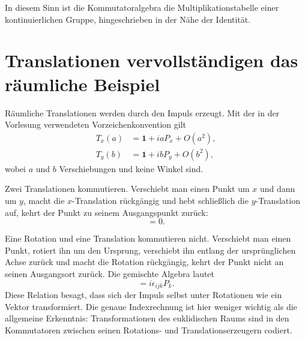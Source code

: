 In diesem Sinn ist die Kommutatoralgebra die Multiplikationstabelle einer kontinuierlichen Gruppe, hingeschrieben in der Nähe der Identität.

\section{Translationen vervollständigen das räumliche Beispiel}

Räumliche Translationen werden durch den Impuls erzeugt. Mit der in der Vorlesung verwendeten Vorzeichenkonvention gilt
\begin{equation}
\begin{aligned}
T_x(a)&=\mathbf 1+iaP_x+O(a^2),\\
T_y(b)&=\mathbf 1+ibP_y+O(b^2),
\end{aligned}
\end{equation}
wobei \(a\) und \(b\) Verschiebungen und keine Winkel sind.

Zwei Translationen kommutieren. Verschiebt man einen Punkt um \(x\) und dann um \(y\), macht die \(x\)-Translation rückgängig und hebt schließlich die \(y\)-Translation auf, kehrt der Punkt zu seinem Ausgangspunkt zurück:
\begin{equation}
[P_i,P_j]=0.
\end{equation}

\begin{classroomqa}
\end{classroomqa}

Eine Rotation und eine Translation kommutieren nicht. Verschiebt man einen Punkt, rotiert ihn um den Ursprung, verschiebt ihn entlang der ursprünglichen Achse zurück und macht die Rotation rückgängig, kehrt der Punkt nicht an seinen Ausgangsort zurück. Die gemischte Algebra lautet
\begin{equation}
[L_i,P_j]=i\epsilon_{ijk}P_k.
\end{equation}
Diese Relation besagt, dass sich der Impuls selbst unter Rotationen wie ein Vektor transformiert. Die genaue Indexrechnung ist hier weniger wichtig als die allgemeine Erkenntnis: Transformationen des euklidischen Raums sind in den Kommutatoren zwischen seinen Rotations- und Translationserzeugern codiert.

